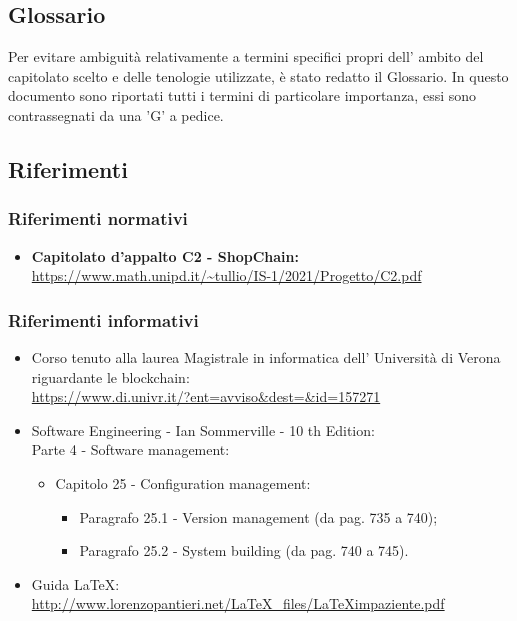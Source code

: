\subsection{Glossario}
Per evitare ambiguità relativamente a termini specifici propri dell' ambito del capitolato scelto e delle tenologie utilizzate, è stato redatto il Glossario.
In questo documento sono riportati tutti i termini di particolare importanza, essi sono contrassegnati da una 'G' a pedice.

\subsection{Riferimenti}
\subsubsection{Riferimenti normativi}
\begin{itemize}
    \item \textbf{Capitolato d'appalto C2 - ShopChain:} \\
    \url{https://www.math.unipd.it/~tullio/IS-1/2021/Progetto/C2.pdf}
\end{itemize}
\subsubsection{Riferimenti informativi}
\begin {itemize}
    \item Corso tenuto alla laurea Magistrale in informatica dell' Università di Verona riguardante le blockchain\glo: \\
    \url{https://www.di.univr.it/?ent=avviso&dest=&id=157271}
    
    \item Software Engineering - Ian Sommerville - 10 th Edition:\\
    Parte 4 - Software management:
    \begin{itemize}
        \item Capitolo 25 - Configuration management:
    
    \begin{itemize}
        \item Paragrafo 25.1 - Version management (da pag. 735 a 740);
        \item Paragrafo 25.2 - System building (da pag. 740 a 745).
    \end{itemize}
\end{itemize}
    \item Guida \LaTeX:\\
    \url{http://www.lorenzopantieri.net/LaTeX_files/LaTeXimpaziente.pdf}
\end{itemize}